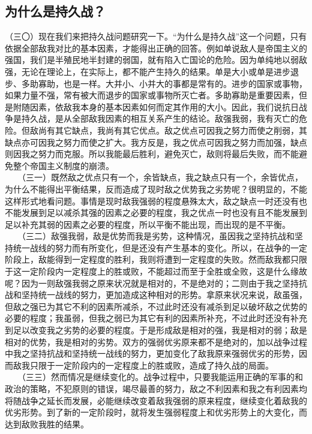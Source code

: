 \documentclass[cn,11pt,chinese]{elegantbook}
\def\myformat#1{\hfil\hfil #1}
\begin{document}
\subsection*{\myformat{为什么是持久战？}}
（三〇）现在我们来把持久战问题研究一下。“为什么是持久战”这一个问题，只有依据全部敌我对比的基本因素，才能得出正确的回答。例如单说敌人是帝国主义的强国，我们是半殖民地半封建的弱国，就有陷入亡国论的危险。因为单纯地以弱敌强，无论在理论上，在实际上，都不能产生持久的结果。单是大小或单是进步退步、多助寡助，也是一样。大并小、小并大的事都是常有的。进步的国家或事物，如果力量不强，常有被大而退步的国家或事物所灭亡者。多助寡助是重要因素，但是附随因素，依敌我本身的基本因素如何而定其作用的大小。因此，我们说抗日战争是持久战，是从全部敌我因素的相互关系产生的结论。敌强我弱，我有灭亡的危险。但敌尚有其它缺点，我尚有其它优点。敌之优点可因我之努力而使之削弱，其缺点亦可因我之努力而使之扩大。我方反是，我之优点可因我之努力而加强，缺点则因我之努力而克服。所以我能最后胜利，避免灭亡，敌则将最后失败，而不能避免整个帝国主义制度的崩溃。\\
　　（三一）既然敌之优点只有一个，余皆缺点，我之缺点只有一个，余皆优点，为什么不能得出平衡结果，反而造成了现时敌之优势我之劣势呢？很明显的，不能这样形式地看问题。事情是现时敌我强弱的程度悬殊太大，敌之缺点一时还没有也不能发展到足以减杀其强的因素之必要的程度，我之优点一时也没有且不能发展到足以补充其弱的因素之必要的程度，所以平衡不能出现，而出现的是不平衡。\\
　　（三二）敌强我弱，敌是优势而我是劣势，这种情况，虽因我之坚持抗战和坚持统一战线的努力而有所变化，但是还没有产生基本的变化。所以，在战争的一定阶段上，敌能得到一定程度的胜利，我则将遭到一定程度的失败。然而敌我都只限于这一定阶段内一定程度上的胜或败，不能超过而至于全胜或全败，这是什么缘故呢？因为一则敌强我弱之原来状况就是相对的，不是绝对的；二则由于我之坚持抗战和坚持统一战线的努力，更加造成这种相对的形势。拿原来状况来说，敌虽强，但敌之强已为其它不利的因素所减杀，不过此时还没有减杀到足以破坏敌之优势的必要的程度；我虽弱，但我之弱已为其它有利的因素所补充，不过此时还没有补充到足以改变我之劣势的必要的程度。于是形成敌是相对的强，我是相对的弱；敌是相对的优势，我是相对的劣势。双方的强弱优劣原来都不是绝对的，加以战争过程中我之坚持抗战和坚持统一战线的努力，更加变化了敌我原来强弱优劣的形势，因而敌我只限于一定阶段内的一定程度上的胜或败，造成了持久战的局面。\\
　　（三三）然而情况是继续变化的。战争过程中，只要我能运用正确的军事的和政治的策略，不犯原则的错误，竭尽最善的努力，敌之不利因素和我之有利因素均将随战争之延长而发展，必能继续改变着敌我强弱的原来程度，继续变化着敌我的优劣形势。到了新的一定阶段时，就将发生强弱程度上和优劣形势上的大变化，而达到敌败我胜的结果。\\
\end{document}
